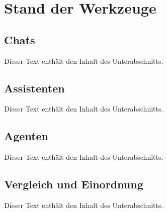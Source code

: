 \section{Stand der Werkzeuge}
\label{sec:04_state-of-tooling}

\subsection{Chats}
\label{subsec:04-01_chats}

Dieser Text enthält den Inhalt des Unterabschnitts.

\subsection{Assistenten}
\label{subsec:04-02_assistants}

Dieser Text enthält den Inhalt des Unterabschnitts.

\subsection{Agenten}
\label{subsec:04-03_agents}

Dieser Text enthält den Inhalt des Unterabschnitts.

\subsection{Vergleich und Einordnung}
\label{subsec:04-04_comparison-and-classification}

Dieser Text enthält den Inhalt des Unterabschnitts.
